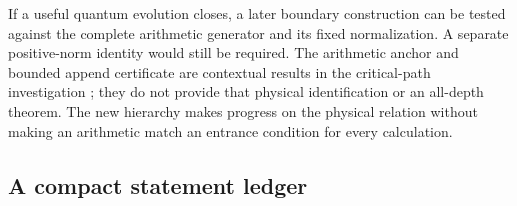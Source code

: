 If a useful quantum evolution closes, a later boundary construction can
be tested against the complete arithmetic generator and its fixed
normalization. A separate positive-norm identity would still be required.
The arithmetic anchor and bounded append certificate are contextual
results in the critical-path investigation \cite{EMAAnchor,CumulativeCoupling};
they do not provide that physical identification or an all-depth theorem.
The new hierarchy makes progress on the physical relation without making
an arithmetic match an entrance condition for every calculation.

\clearpage
\subsection{A compact statement ledger}

\renewcommand{\arraystretch}{1.13}
